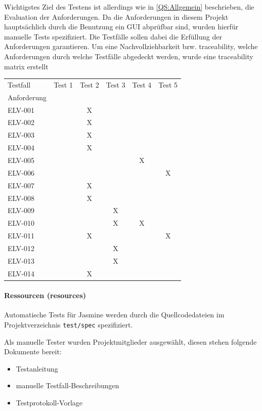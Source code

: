 Wichtigstes Ziel des Testens ist allerdings wie in \ref{QS:Allgemein} beschrieben, die Evaluation der Anforderungen. Da die Anforderungen in diesem Projekt hauptsächlich durch die Benutzung ein GUI abprüfbar sind, wurden hierfür manuelle Tests spezifiziert. Die Testfälle sollen dabei die Erfüllung der Anforderungen garantieren\cite[Based on property coverage, Seite 16]{Pernambuco:TestTechniques}. Um eine Nachvollziehbarkeit bzw. traceability, welche Anforderungen durch welche Testfälle abgedeckt werden, wurde eine traceability matrix erstellt\cite[Seite 101, Figure 28]{Pernambuco:TestTechniques}\\
\begin{tabular}{l|ccccc}
Testfall 	& Test 1 	& Test 2 	& Test 3 	& Test 4 	& Test 5 \\
Anforderung &&&&& \\ \hline
ELV-001 	& 			& X			& 			&			&		\\
ELV-002 	& 			& X			& 			&			&		\\
ELV-003 	& 			& X			& 			&			&		\\
ELV-004 	& 			& X			& 			&			&		\\
ELV-005 	& 			& 			& 			&	X		&		\\
ELV-006 	& 			& 			& 			&			&	X	\\
ELV-007 	& 			& X			& 			&			&		\\
ELV-008 	& 			& X			& 			&			&		\\
ELV-009 	& 			& 			& X			&			&		\\
ELV-010 	& 			& 			& X			&	X		&		\\
ELV-011 	& 			& X			& 			&			&	X	\\
ELV-012 	& 			& 			& X			&			&		\\
ELV-013 	& 			& 			& X			&			&		\\
ELV-014 	& 			& X			& 			&			&		\\
\end{tabular}
\paragraph{Ressourcen (resources)}
Automatische Tests für Jasmine werden durch die Quellcodedateien im Projektverzeichnis \texttt{test/spec} spezifiziert.

Als manuelle Tester wurden Projektmitglieder ausgewählt, diesen stehen folgende Dokumente bereit:
\begin{itemize}
	\item Testanleitung
	\item manuelle Testfall-Beschreibungen
	\item Testprotokoll-Vorlage
\end{itemize}

